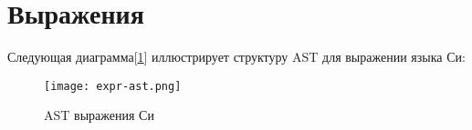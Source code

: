 
\clearpage
\section{Выражения}

Следующая диаграмма[\ref{parsing:expr-ast-diag}] иллюстрирует структуру AST для выражении языка Си: 




\begin{figure}[h!]
    \texttt{[image: expr-ast.png]}
    \centering
    \caption{AST выражения Си}
    \label{parsing:expr-ast-diag}
\end{figure}


